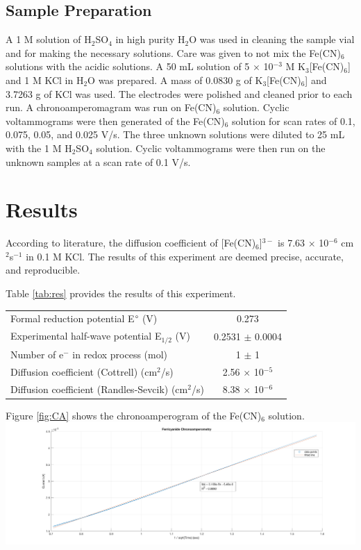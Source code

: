 \documentclass{article}
\begin{document}
\begin{multicols}{2}
{\subsection*{Sample Preparation}
A 1 M solution of H$_2$SO$_4$ in high purity H$_2$O was used in cleaning the
sample vial and for making the necessary solutions. 
Care was given to not mix the Fe(CN)$_6$ solutions with the acidic solutions.
A 50 mL solution of 5 $\times$ 10$^{-3}$ M K$_3$[Fe(CN)$_6$] and 1 M KCl in H$_2$O was prepared.
A mass of 0.0830 g of K$_3$[Fe(CN)$_6$] and 3.7263 g of KCl was used.
The electrodes were polished and cleaned prior to each run. 
A chronoamperomagram was run on Fe(CN)$_6$ solution. Cyclic voltammograms were
then generated of the Fe(CN)$_6$ solution for scan rates of 0.1, 0.075, 0.05,
and 0.025 V/s.
The three unknown solutions were diluted to 25 mL with the 1 M H$_2$SO$_4$ solution.
Cyclic voltammograms were then run on the unknown samples at a scan rate of 0.1
V/s. 

\section*{Results}
According to literature, the diffusion coefficient of [Fe(CN)$_6$]$^{3-}$ is
7.63 $\times$ 10$^{-6}$ cm$^2$s$^{-1}$ in 0.1 M KCl. \cite{trau} 
The results of this experiment are deemed precise, accurate, and reproducible.

Table \ref{tab:res} provides the results of this experiment.
\begin{center}
    \begin{tabular}{l|c}
        \hline
        Formal reduction potential E$\degree$ (V) & 0.273 \\
        Experimental half-wave potential E$_{1/2}$ (V) & 0.2531 $\pm$ 0.0004 \\
        Number of e$^-$ in redox process (mol) & 1 $\pm$ 1 \\
        Diffusion coefficient (Cottrell) (cm$^2$/s) & 2.56 $\times$ 10$^{-5}$ \\
        Diffusion coefficient (Randles-Sevcik) (cm$^2$/s) & 8.38 $\times$ 10$^{-6}$ \\
    \end{tabular}
    \label{tab:res}
\end{center}

Figure \ref{fig:CA} shows the chronoamperogram of the Fe(CN)$_6$ solution.
\includegraphics[scale=0.1]{CA}
    \label{fig:CA}

}
\end{multicols}
\end{document}
